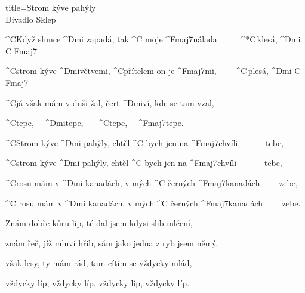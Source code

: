 \begin{song}{title=\predtitle\centering Strom kýve pahýly \\\large Divadlo Sklep \vspace*{-0.3cm}}  %
\begin{centerjustified}

\sloka
	^{C\z}Když slunce ^{Dmi \z}zapadá, tak ^{C \z}moje ^{\z Fmaj7}nálada~~~~~ ^*{\z C\,}klesá, ^{Dmi\,\,C\,\,Fmaj7}

	^{C\z}strom kýve ^{Dmi\z}větvemi, ^{C}přítelem on je ^{Fmaj7}mi,~~~~ ^{\z C\,}plesá, ^{Dmi\,\,C\,\,Fmaj7}

	^{C}já však mám v duši žal, čert ^{Dmi}ví, kde se tam vzal,

	^{C}tepe,~~ ^{\z Dmi}tepe,~~~ ^{C}tepe,~~ ^{\z Fmaj7}tepe.~~~~

	^{C\z}Strom kýve ^{Dmi \z}pahýly, chtěl ^{C \z}bych jen na ^{\z Fmaj7}chvíli~~~~~~ tebe,

	^{C\z}strom kýve ^{Dmi \z}pahýly, chtěl ^{C \z}bych jen na ^{\z Fmaj7}chvíli~~~~~~ tebe,

	^{C\z}rosu mám v ^{Dmi \z}kanadách, v mých ^{C \z}černých ^{\z Fmaj7}kanadách~~~~ zebe,

	^{C \z}rosu mám v ^{Dmi \z}kanadách, v mých ^{C \z}černých ^{\z Fmaj7}kanadách~~~~ zebe.


\sloka
	Znám dobře kůru lip, té dal jsem kdysi slib mlčení,

	znám řeč, jíž mluví hřib, sám jako jedna z ryb jsem němý,

	však lesy, ty mám rád, tam cítím se vždycky mlád,

	vždycky líp, vždycky líp, vždycky líp, vždycky líp.




\end{centerjustified}
\setcounter{Slokočet}{0}
\end{song}
